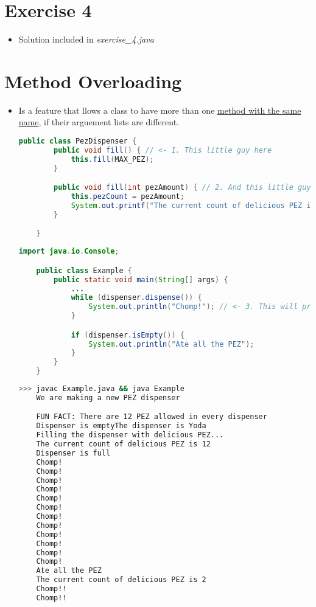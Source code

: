 \documentclass[12pt]{article}
\begin{document}
\bigskip

\section{Exercise 4}

\bigskip

\begin{itemize}
    \item Solution included in \textit{exercise\_4.java}
\end{itemize}

\bigskip

\section{Method Overloading}

\bigskip

\begin{itemize}
    \item Is a feature that llows a class to have more than one \underline{method
    with the same name}, if their arguement lists are different.


    \begin{lstlisting}[language=Java,caption={lesson\_9/PezDispenser.java}]
    public class PezDispenser {
        public void fill() { // <- 1. This little guy here
            this.fill(MAX_PEZ);
        }

        public void fill(int pezAmount) { // 2. And this little guy here :)
            this.pezCount = pezAmount;
            System.out.printf("The current count of delicious PEZ is %d\n", this.pezCount);
        }

    }
    \end{lstlisting}

    \begin{lstlisting}[language=Java,caption={lesson\_9/Example.java}]
    import java.io.Console;

    public class Example {
        public static void main(String[] args) {
            ...
            while (dispenser.dispense()) {
                System.out.println("Chomp!"); // <- 3. This will print as long as .dispensed() returns true
            }

            if (dispenser.isEmpty()) {
                System.out.println("Ate all the PEZ");
            }
        }
    }
    \end{lstlisting}

    \begin{lstlisting}[language=bash,caption={Terminal}]
    >>> javac Example.java && java Example
    We are making a new PEZ dispenser

    FUN FACT: There are 12 PEZ allowed in every dispenser
    Dispenser is emptyThe dispenser is Yoda
    Filling the dispenser with delicious PEZ...
    The current count of delicious PEZ is 12
    Dispenser is full
    Chomp!
    Chomp!
    Chomp!
    Chomp!
    Chomp!
    Chomp!
    Chomp!
    Chomp!
    Chomp!
    Chomp!
    Chomp!
    Chomp!
    Ate all the PEZ
    The current count of delicious PEZ is 2
    Chomp!!
    Chomp!!
    \end{lstlisting}
\end{itemize}
\end{document}
